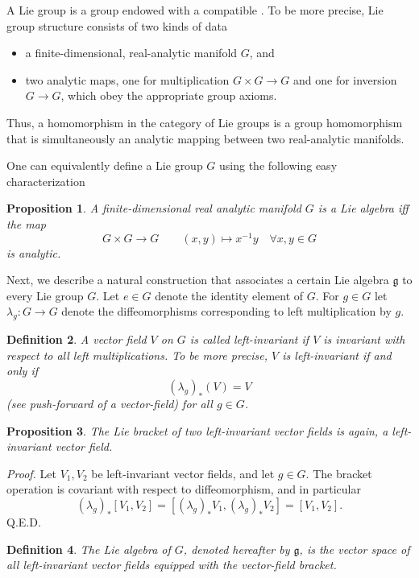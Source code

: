 \documentclass[12pt]{article}
\newcommand{\fg}{\mathfrak{g}}
\newcommand{\lact}{\lambda}
\newtheorem{proposition}{Proposition}
\newtheorem{definition}[proposition]{Definition}
\begin{document}
A Lie group is a group endowed with a compatible .
To be more precise, Lie group structure consists of two kinds of
data
\begin{itemize}
\item a finite-dimensional, real-analytic manifold $G$, and
\item  two analytic maps, one for multiplication $G\times
  G\rightarrow G$ and one for inversion $G\rightarrow G$, which obey
  the appropriate
  group axioms.
\end{itemize}
Thus, a homomorphism in the category of Lie groups is a group
homomorphism that is simultaneously an analytic mapping between two
real-analytic manifolds.

One can equivalently define a Lie group $G$ using the following easy characterization

\begin{proposition}
A finite-dimensional real analytic manifold $G$ is a Lie algebra iff the map
$$G\times G \rightarrow G \qquad (x,y)\mapsto x^{-1}y \quad \forall x,y\in G$$
is analytic.
\end{proposition}

Next, we describe a natural construction that associates a certain
Lie algebra $\fg$ to every Lie group $G$.  Let $e\in G$ denote the
identity element of $G$.
For $g\in G$ let $\lact_g \colon G \to G$ denote the
diffeomorphisms corresponding to left multiplication by $g$.  

\begin{definition}
  A vector field $V$ on $G$ is called left-invariant if $V$ is
  invariant with respect to all left multiplications.  To be more
  precise, $V$ is left-invariant if and only if
  $$(\lact_g)_*(V) = V$$
  (see push-forward of a vector-field) for all
  $g\in G$.   
\end{definition}
\begin{proposition}
  The Lie bracket of two left-invariant vector fields is
  again, a left-invariant vector field.
\end{proposition}
{\em Proof.}
Let $V_1, V_2$ be left-invariant vector fields, and let $g\in G$.
The bracket operation is covariant with respect to diffeomorphism, and
in particular
$$(\lact_g)_*[V_1,V_2] = [(\lact_g)_*V_1,(\lact_g)_*V_2] =
[V_1,V_2].$$
Q.E.D.

\begin{definition}
  The Lie algebra of $G$, denoted hereafter by $\fg$, is the vector space
  of all left-invariant vector fields equipped with the vector-field
  bracket.
\end{definition}
\end{document}
